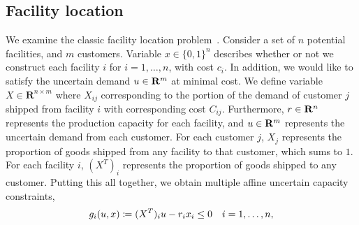 \documentclass[12pt]{article}
\newcommand{\citep}{\cite}
\theoremstyle{thmstyleone}%
\theoremstyle{thmstyletwo}%
\theoremstyle{thmstylethree}%
\begin{document}
\subsection{Facility location}
\label{sub:facility}
We examine the classic facility location problem~\citep{bertsimas_probabilistic,HOLMBERG1999544}.
Consider a set of $n$ potential facilities, and $m$ customers.
Variable $x \in \{0, 1\}^n$ describes whether or not we construct each facility $i$ for $i=1, \dots, n$,  with cost $c_i$.
In addition, we would like to satisfy the uncertain demand $u\in {\mathbf R}^m$ at minimal cost.
We define variable $X\in\mathbf{R}^{n\times m}$ where $X_{ij}$ corresponding to the portion of the demand of customer $j$ shipped from facility $i$ with corresponding cost $C_{ij}$.
Furthermore, $r \in {\mathbf R}^n$ represents the production capacity for each facility, and $u\in {\mathbf R}^m$ represents the uncertain demand from each customer.
For each customer $j$, $X_j$ represents the proportion of goods shipped from any facility to that customer, which sums to $1$.
For each facility $i$, $(X^T)_i$ represents the proportion of goods shipped to any customer.
Putting this all together, we obtain multiple affine uncertain capacity constraints,
\begin{equation*}
	g_i(u,x) \coloneqq (X^T)_i u - r_i x_i \leq 0 \quad i = 1,\dots,n,
\end{equation*}
\end{document}
